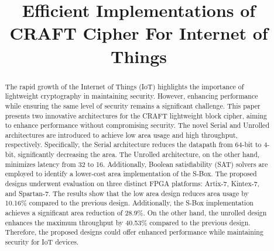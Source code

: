 \documentclass[final,5p,times,twocolumn]{elsarticle}
\begin{document}
\begin{frontmatter}

    \title{Efficient Implementations of CRAFT Cipher For Internet of Things }










    \begin{abstract}
        The rapid growth of the Internet of Things (IoT) highlights the importance of lightweight cryptography in maintaining security.
        However, enhancing performance while ensuring the same level of security remains a significant challenge.
        This paper presents two innovative architectures for the CRAFT lightweight block cipher, aiming to enhance performance without compromising security.
        The novel Serial and Unrolled architectures are introduced to achieve low area usage and high throughput, respectively.
        Specifically, the Serial architecture reduces the datapath from 64-bit to 4-bit, significantly decreasing the area.
        The Unrolled architecture, on the other hand, minimizes latency from 32 to 16.
        Additionally, Boolean satisfiability (SAT) solvers are employed to identify a lower-cost area implementation of the S-Box.
        The proposed designs underwent evaluation on three distinct FPGA platforms: Artix-7, Kintex-7, and Spartan-7.
        The results show that the low area design reduces area usage by 10.16\% compared to the previous design. Additionally, the S-Box implementation achieves a significant area reduction of 28.9\%. On the other hand, the unrolled design enhances the maximum throughput by 40.53\% compared to the previous design. Therefore, the proposed designs could offer enhanced performance while maintaining security for IoT devices.
    \end{abstract}



\end{frontmatter}
\end{document}

